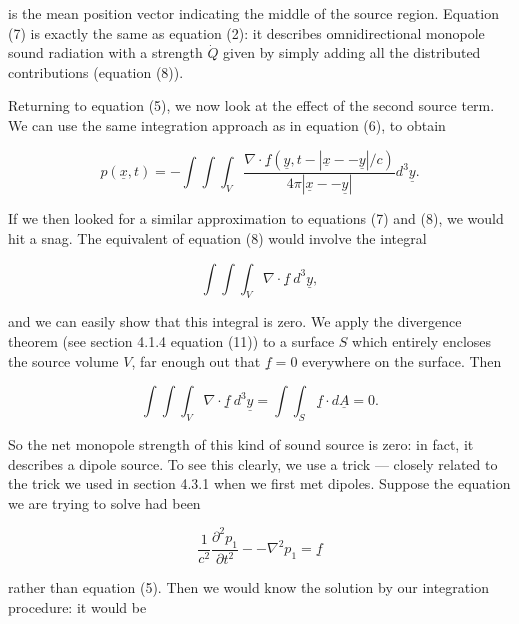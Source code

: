   \noindent{}is the mean position vector indicating the middle of the source 
  region. Equation (7) is exactly the same as equation (2): it describes 
  omnidirectional monopole sound radiation with a strength $\dot{Q}$ given by 
  simply adding all the distributed contributions (equation (8)). 

  Returning to equation (5), we now look at the effect of the second source 
  term. We can use the same integration approach as in equation (6), to obtain 

  \begin{equation*}p(\underline{x},t)=- \int \int \int_V{\dfrac{\nabla \cdot 
  \underline{f}(\underline{y},t-|\underline{x} -- \underline{y}|/c)}{4 \pi 
  |\underline{x} -- \underline{y}|} d^3 \underline{y}} . 
  \tag{11}\end{equation*} 

  If we then looked for a similar approximation to equations (7) and (8), we 
  would hit a snag. The equivalent of equation (8) would involve the integral 

  \begin{equation*}\int \int \int_V{\nabla \cdot \underline{f} \mathrm{~}d^3 
  \underline{y}}, \tag{12}\end{equation*} 

  \noindent{}and we can easily show that this integral is zero. We apply the 
  divergence theorem (see section 4.1.4 equation (11)) to a surface $S$ which 
  entirely encloses the source volume $V$, far enough out that 
  $\underline{f}=0$ everywhere on the surface. Then 

  \begin{equation*}\int \int \int_V{\nabla \cdot \underline{f} \mathrm{~}d^3 
  \underline{y}} = \int \int_S{\underline{f} \cdot d\underline{A}} = 0 . 
  \tag{13}\end{equation*} 

  So the net monopole strength of this kind of sound source is zero: in fact, 
  it describes a dipole source. To see this clearly, we use a trick --- closely 
  related to the trick we used in section 4.3.1 when we first met dipoles. 
  Suppose the equation we are trying to solve had been 

  \begin{equation*}\dfrac{1}{c^2} \dfrac{\partial^2 p_1}{\partial t^2} -- 
  \nabla^2 p_1 = \underline{f} \tag{14}\end{equation*} 

  \noindent{}rather than equation (5). Then we would know the solution by our 
  integration procedure: it would be 

